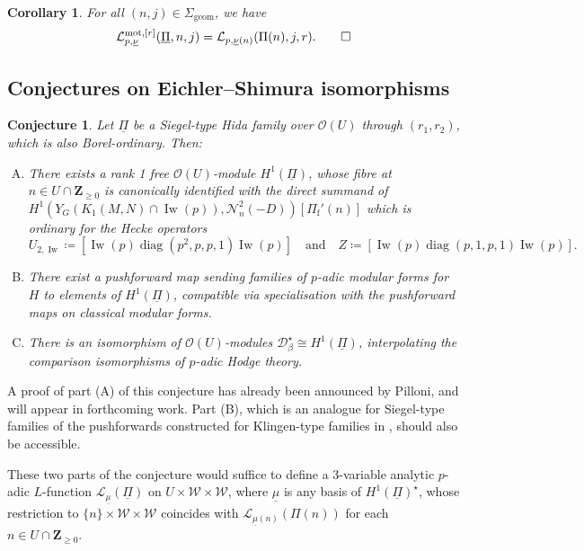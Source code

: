 \documentclass[cjm]{ipart}
\theoremstyle{plain}
\newtheorem{corollary}[theorem]{Corollary}
\newtheorem{conjecture}[theorem]{Conjecture}
\theoremstyle{remark}
\DeclareMathOperator{\diag}{diag}
\DeclareMathOperator{\Iw}{Iw}
\DeclareMathOperator{\mot}{mot}
\newcommand{\Pif}{\Pi_{\mathrm{f}}}
\newcommand{\ZZ}{\mathbf{Z}}
\newcommand{\cD}{\mathcal{D}}
\newcommand{\cL}{\mathcal{L}}
\newcommand{\cN}{\mathcal{N}}
\newcommand{\cO}{\mathcal{O}}
\newcommand{\cW}{\mathcal{W}}
\newcommand{\uPi}{\underline{\Pi}}
\newcommand{\unu}{\underline{\nu}}
\numberwithin{equation}{subsection}
\renewcommand{\ge}{\geqslant}
\begin{document}
  \begin{corollary}
   \label{cor:motivicequalsanalytic}
   For all $(n, j) \in \Sigma_{\mathrm{geom}}$, we have
   \[ \cL^{\mot, [r]}_{p, \unu}(\uPi, n, j) = \cL_{p, \unu(n)}(\Pi(n), j, r).\qed\]
  \end{corollary}

 \subsection{Conjectures on Eichler--Shimura isomorphisms}
  \label{sect:ESconj}

  \begin{conjecture}
   \label{conj:ESiso}
   Let $\uPi$ be a Siegel-type Hida family over $\cO(U)$ through $(r_1, r_2)$, which is also Borel-ordinary. Then:
   \begin{enumerate}[(A)]
    \item There exists a rank 1 free $\cO(U)$-module $H^1(\uPi)$, whose fibre at $n \in U \cap \ZZ_{\ge 0}$ is canonically identified with the direct summand of
    $H^1\left(Y_G(K_1(M, N) \cap \Iw(p)), \cN_n^2(-D)\right)[\Pif'(n)]$ which is ordinary for the Hecke operators
    \[ U_{2, \Iw} \coloneqq \left[\Iw(p) \diag(p^2, p, p, 1)\Iw(p)\right] \quad\text{and}\quad
    Z \coloneqq \left[\Iw(p) \diag(p, 1, p, 1) \Iw(p)\right].
    \]
    \item There exist a pushforward map sending families of $p$-adic modular forms for $H$ to elements of $H^1(\uPi)$, compatible via specialisation with the pushforward maps on classical modular forms.

    \item There is an isomorphism of $\cO(U)$-modules $\cD_{\beta}^\star \cong H^1(\uPi)$, interpolating the comparison isomorphisms of $p$-adic Hodge theory.
   \end{enumerate}
  \end{conjecture}

  A proof of part (A) of this conjecture has already been announced by Pilloni, and will appear in forthcoming work. Part (B), which is an analogue for Siegel-type families of the pushforwards constructed for Klingen-type families in \cite{LPSZ1}, should also be accessible.

  These two parts of the conjecture would suffice to define a 3-variable analytic $p$-adic $L$-function $\cL_{\underline{\mu}}(\uPi)$ on $U \times \cW \times \cW$, where $\underline{\mu}$ is any basis of $H^1(\uPi)^\star$, whose restriction to $\{n\} \times \cW \times \cW$ coincides with $\cL_{\underline{\mu}(n)}(\Pi(n))$ for each $n \in U \cap \ZZ_{\ge 0}$.
\end{document}
